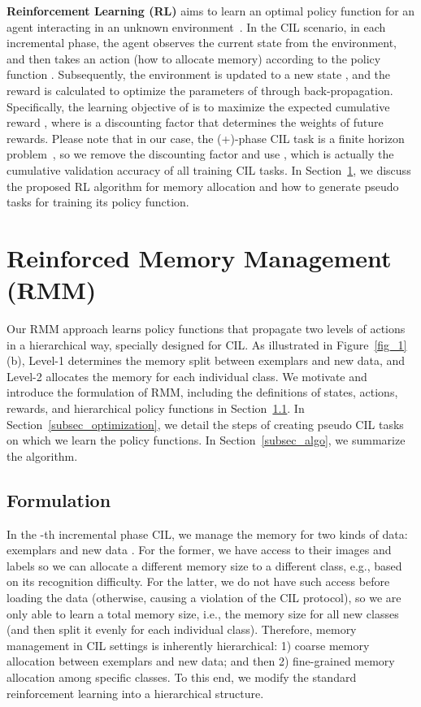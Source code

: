 \documentclass{article}
\newcommand{\myparagraph}[1]{\vspace{0.1em}\noindent\textbf{#1}}
\begin{document}
\myparagraph{Reinforcement Learning (RL)} aims to learn an optimal policy function  for an agent interacting in an unknown environment~\cite{williams1992simple,xu2018reinforced,ZophL17}. In the CIL scenario, in each incremental phase, the agent observes the current state  from the environment, and then takes an action  (how to allocate memory) according to the policy function . Subsequently, the environment is updated to a new state , and the reward  is calculated to optimize the parameters of  through back-propagation. 
Specifically, the learning objective of  is to maximize the expected cumulative reward , where  is a discounting factor that determines the weights of future rewards. Please note that in our case, the (+)-phase CIL task is a finite horizon problem~\cite{glorennec2000reinforcement,ZophL17}, so we remove the discounting factor and use , which is actually
the cumulative validation accuracy of all training CIL tasks. In Section~\ref{sec_method}, we discuss the proposed RL algorithm for memory allocation and how to generate pseudo tasks for training its policy function. \section{Reinforced Memory Management (RMM)}
\label{sec_method}

Our RMM approach learns policy functions that propagate two levels of actions in a hierarchical way, specially designed for CIL. As illustrated in Figure~\ref{fig_1} (b), Level-1 determines the memory split between exemplars and new data, and Level-2 allocates the memory for each individual class. We motivate and introduce the formulation of RMM, including the definitions of states, actions, rewards, and hierarchical policy functions in Section~\ref{subsec_RMM_formulation}. In Section~\ref{subsec_optimization}, we detail the steps of creating pseudo CIL tasks on which we learn the policy functions. In Section~\ref{subsec_algo}, we summarize the algorithm.

\subsection{Formulation}
\label{subsec_RMM_formulation}

In the -th incremental phase CIL, we manage the memory for two kinds of data: exemplars  and new data . For the former, 
we have access to their images and labels
so we can allocate a different memory size to a different class, e.g., based on its recognition difficulty.
For the latter, we do not have such access before loading the data (otherwise, causing a violation of the CIL protocol), so we are only able to learn a total memory size, i.e., the memory size for all new classes (and then split it evenly for each individual class).
Therefore, memory management in CIL settings is inherently hierarchical: 1) coarse memory allocation between exemplars and new data; and then 2) fine-grained memory allocation among specific classes. To this end, we modify the standard reinforcement learning into a hierarchical structure.
\end{document}
